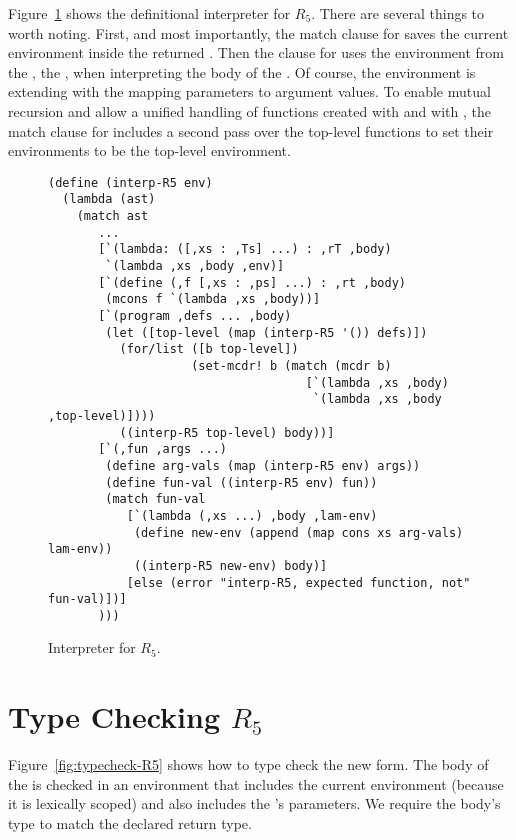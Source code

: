 \documentclass[11pt]{book}
\begin{document}
Figure~\ref{fig:interp-R5} shows the definitional interpreter for
$R_5$. There are several things to worth noting. First, and most
importantly, the match clause for  saves the current
environment inside the returned . Then the clause for
 uses the environment from the , the
, when interpreting the body of the .  Of
course, the  environment is extending with the mapping
parameters to argument values. To enable mutual recursion and allow a
unified handling of functions created with  and with
, the match clause for  includes a second
pass over the top-level functions to set their environments to be the
top-level environment.

\begin{figure}[tbp]
\begin{lstlisting}
(define (interp-R5 env)
  (lambda (ast)
    (match ast
       ...
       [`(lambda: ([,xs : ,Ts] ...) : ,rT ,body)
        `(lambda ,xs ,body ,env)]
       [`(define (,f [,xs : ,ps] ...) : ,rt ,body)
        (mcons f `(lambda ,xs ,body))]
       [`(program ,defs ... ,body)
        (let ([top-level (map (interp-R5 '()) defs)])
          (for/list ([b top-level])
                    (set-mcdr! b (match (mcdr b)
                                    [`(lambda ,xs ,body)
                                     `(lambda ,xs ,body ,top-level)])))
          ((interp-R5 top-level) body))]
       [`(,fun ,args ...)
        (define arg-vals (map (interp-R5 env) args))
        (define fun-val ((interp-R5 env) fun))
        (match fun-val
           [`(lambda (,xs ...) ,body ,lam-env)
            (define new-env (append (map cons xs arg-vals) lam-env))
            ((interp-R5 new-env) body)]
           [else (error "interp-R5, expected function, not" fun-val)])]
       )))
\end{lstlisting}
\caption{Interpreter for $R_5$.}
\label{fig:interp-R5}
\end{figure}

\section{Type Checking $R_5$}

Figure~\ref{fig:typecheck-R5} shows how to type check the new
 form. The body of the  is checked in an
environment that includes the current environment (because it is
lexically scoped) and also includes the 's parameters.  We
require the body's type to match the declared return type.
\end{document}
